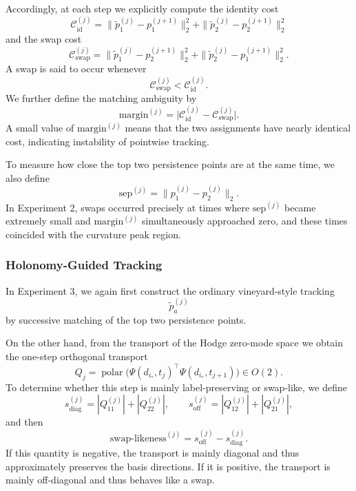 \documentclass[pdflatex,sn-mathphys-num]{sn-jnl}%
\theoremstyle{thmstyleone}%
\theoremstyle{thmstyletwo}%
\theoremstyle{thmstylethree}%
\begin{document}
\begin{appendices}
Accordingly, at each step we explicitly compute the identity cost
\[
\mathcal C_{\mathrm{id}}^{(j)}
=
\|\widetilde p_1^{(j)}-p_1^{(j+1)}\|_2^2
+
\|\widetilde p_2^{(j)}-p_2^{(j+1)}\|_2^2
\]
and the swap cost
\[
\mathcal C_{\mathrm{swap}}^{(j)}
=
\|\widetilde p_1^{(j)}-p_2^{(j+1)}\|_2^2
+
\|\widetilde p_2^{(j)}-p_1^{(j+1)}\|_2^2.
\]
A swap is said to occur whenever
\[
\mathcal C_{\mathrm{swap}}^{(j)}<\mathcal C_{\mathrm{id}}^{(j)}.
\]
We further define the matching ambiguity by
\[
\mathrm{margin}^{(j)}
=
\bigl|
\mathcal C_{\mathrm{id}}^{(j)}
-
\mathcal C_{\mathrm{swap}}^{(j)}
\bigr|.
\]
A small value of \(\mathrm{margin}^{(j)}\) means that the two assignments have nearly identical cost, indicating instability of pointwise tracking.

To measure how close the top two persistence points are at the same time, we also define
\[
\mathrm{sep}^{(j)}
=
\|p_1^{(j)}-p_2^{(j)}\|_2.
\]
In Experiment 2, swaps occurred precisely at times where \(\mathrm{sep}^{(j)}\) became extremely small and \(\mathrm{margin}^{(j)}\) simultaneously approached zero, and these times coincided with the curvature peak region.

\subsubsection{Holonomy-Guided Tracking}

In Experiment 3, we again first construct the ordinary vineyard-style tracking
\[
\widetilde p_a^{(j)}
\]
by successive matching of the top two persistence points.

On the other hand, from the transport of the Hodge zero-mode space we obtain the one-step orthogonal transport
\[
Q_j
=
\operatorname{polar}
\bigl(
\Psi(d_{i_\ast},t_j)^\top \Psi(d_{i_\ast},t_{j+1})
\bigr)
\in O(2).
\]
To determine whether this step is mainly label-preserving or swap-like, we define
\[
s_{\mathrm{diag}}^{(j)}
=
|Q_{11}^{(j)}|+|Q_{22}^{(j)}|,
\qquad
s_{\mathrm{off}}^{(j)}
=
|Q_{12}^{(j)}|+|Q_{21}^{(j)}|,
\]
and then
\[
\mathrm{swap\text{-}likeness}^{(j)}
=
s_{\mathrm{off}}^{(j)}-s_{\mathrm{diag}}^{(j)}.
\]
If this quantity is negative, the transport is mainly diagonal and thus approximately preserves the basis directions. If it is positive, the transport is mainly off-diagonal and thus behaves like a swap.


\end{appendices}
\end{document}
